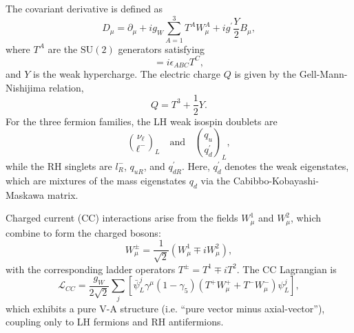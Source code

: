 The covariant derivative is defined as
\begin{equation}
D_\mu = \partial_\mu + ig_W \sum_{A=1}^3 T^A W_\mu^A+ ig^\prime \frac{Y}{2}B_\mu,
\end{equation}
where $T^A$ are the $\mathrm{SU}(2)$ generators satisfying
\begin{equation}
[T^A,T^B]=i\epsilon_{ABC}T^C,
\end{equation}
and $Y$ is the weak hypercharge. The electric charge $Q$ is given by the Gell-Mann-Nishijima relation,
\begin{equation}
Q=T^3+\frac{1}{2}Y.
\end{equation}
For the three fermion families, the LH weak isospin doublets are
\begin{equation}
\binom{\nu_\ell}{\ell^-}_L \quad \mathrm{and} \quad \binom{q_u}{q_d^\prime}_L,
\end{equation}
while the RH singlets are $l_R^-$, $q_{uR}$, and $q_{dR}^\prime$. Here, $q_d^\prime$ denotes the weak eigenstates, which are mixtures of the mass eigenstates $q_d$ via the Cabibbo-Kobayashi-Maskawa matrix.

Charged current (CC) interactions arise from the fields $W_\mu^1$ and $W_\mu^2$, which combine to form the charged bosons:
\begin{equation}
W_\mu^\pm = \frac{1}{\sqrt{2}}(W_\mu^1 \mp i W_\mu^2),
\end{equation}
with the corresponding ladder operators $T^\pm = T^1 \mp iT^2$. The CC Lagrangian is
\begin{equation}
\mathcal{L}_{CC}= \frac{g_W}{2\sqrt{2}} \sum_j \left[ \bar{\psi}_L^j \gamma^\mu (1-\gamma_5)(T^+W_\mu^+ + T^- W_\mu^-)\psi_L^j\right],
\end{equation}
which exhibits a pure V-A structure (i.e. ``pure vector minus axial-vector''), coupling only to LH fermions and RH antifermions.

